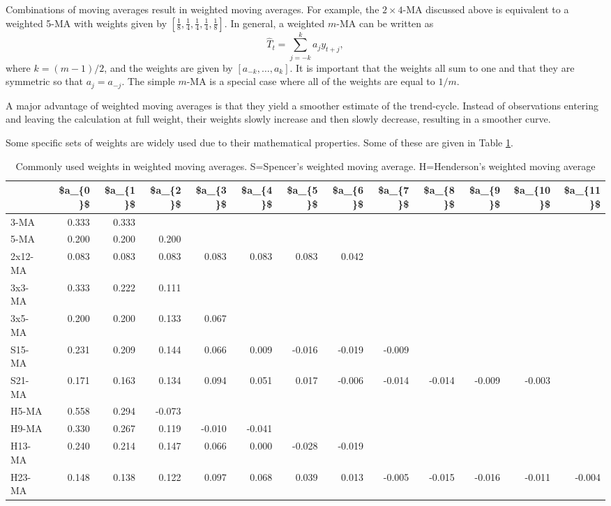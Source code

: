 \documentclass[]{book}
\begin{document}
Combinations of moving averages result in weighted moving averages. For example, the \(2\times4\)-MA discussed above is equivalent to a weighted 5-MA with weights given by
\(\left[\frac{1}{8},\frac{1}{4},\frac{1}{4},\frac{1}{4},\frac{1}{8}\right]\). In general, a weighted \(m\)-MA can be written as
\[
  \hat{T}_t = \sum_{j=-k}^k a_j y_{t+j},
\]
where \(k=(m-1)/2\), and the weights are given by \(\left[a_{-k},\dots,a_k\right]\). It is important that the weights all sum to one and that they are symmetric so that \(a_j = a_{-j}\). The simple \(m\)-MA is a special case where all of the weights are equal to \(1/m\).

A major advantage of weighted moving averages is that they yield a smoother estimate of the trend-cycle. Instead of observations entering and leaving the calculation at full weight, their weights slowly increase and then slowly decrease, resulting in a smoother curve.

Some specific sets of weights are widely used due to their mathematical properties. Some of these are given in Table \ref{tab:weights}.

\begin{table}[t]

\caption{\label{tab:weights}Commonly used weights in weighted moving averages. S=Spencer's weighted moving average. H=Henderson's weighted moving average}
\centering
\begin{tabular}{lrrrrrrrrrrrr}
\toprule
  & \$a\_\{0\}\$ & \$a\_\{1\}\$ & \$a\_\{2\}\$ & \$a\_\{3\}\$ & \$a\_\{4\}\$ & \$a\_\{5\}\$ & \$a\_\{6\}\$ & \$a\_\{7\}\$ & \$a\_\{8\}\$ & \$a\_\{9\}\$ & \$a\_\{10\}\$ & \$a\_\{11\}\$\\
\midrule
3-MA & 0.333 & 0.333 &    &    &    &    &    &    &    &    &    &   \\
5-MA & 0.200 & 0.200 & 0.200 &    &    &    &    &    &    &    &    &   \\
2x12-MA & 0.083 & 0.083 & 0.083 & 0.083 & 0.083 & 0.083 & 0.042 &    &    &    &    &   \\
3x3-MA & 0.333 & 0.222 & 0.111 &    &    &    &    &    &    &    &    &   \\
3x5-MA & 0.200 & 0.200 & 0.133 & 0.067 &    &    &    &    &    &    &    &   \\
\addlinespace
S15-MA & 0.231 & 0.209 & 0.144 & 0.066 & 0.009 & -0.016 & -0.019 & -0.009 &    &    &    &   \\
S21-MA & 0.171 & 0.163 & 0.134 & 0.094 & 0.051 & 0.017 & -0.006 & -0.014 & -0.014 & -0.009 & -0.003 &   \\
H5-MA & 0.558 & 0.294 & -0.073 &    &    &    &    &    &    &    &    &   \\
H9-MA & 0.330 & 0.267 & 0.119 & -0.010 & -0.041 &    &    &    &    &    &    &   \\
H13-MA & 0.240 & 0.214 & 0.147 & 0.066 & 0.000 & -0.028 & -0.019 &    &    &    &    &   \\
\addlinespace
H23-MA & 0.148 & 0.138 & 0.122 & 0.097 & 0.068 & 0.039 & 0.013 & -0.005 & -0.015 & -0.016 & -0.011 & -0.004\\
\bottomrule
\end{tabular}
\end{table}
\end{document}
